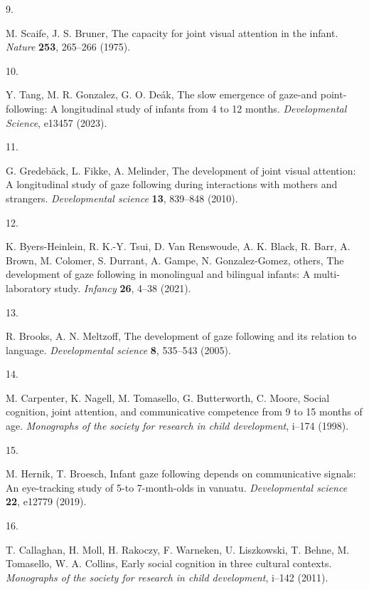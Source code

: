 \documentclass[
  man,floatsintext]{apa6}
\newlength{\cslhangindent}
\newlength{\csllabelwidth}
\newlength{\cslentryspacingunit} %
\newenvironment{CSLReferences}[2] %
 {%
  \setlength{\parindent}{0pt}
  \ifodd #1
  \let\oldpar\par
  \def\par{\hangindent=\cslhangindent\oldpar}
  \fi
  \setlength{\parskip}{#2\cslentryspacingunit}
 }%
 {}
\newcommand{\CSLLeftMargin}[1]{\parbox[t]{\csllabelwidth}{#1}}
\newcommand{\CSLRightInline}[1]{\parbox[t]{\linewidth - \csllabelwidth}{#1}\break}
\begin{document}
\begin{CSLReferences}{0}{0}
\leavevmode{}%
\CSLLeftMargin{9. }%
\CSLRightInline{M. Scaife, J. S. Bruner, The capacity for joint visual attention in the infant. \emph{Nature} \textbf{253}, 265--266 (1975).}

\leavevmode{}%
\CSLLeftMargin{10. }%
\CSLRightInline{Y. Tang, M. R. Gonzalez, G. O. Deák, The slow emergence of gaze-and point-following: A longitudinal study of infants from 4 to 12 months. \emph{Developmental Science}, e13457 (2023).}

\leavevmode{}%
\CSLLeftMargin{11. }%
\CSLRightInline{G. Gredebäck, L. Fikke, A. Melinder, The development of joint visual attention: A longitudinal study of gaze following during interactions with mothers and strangers. \emph{Developmental science} \textbf{13}, 839--848 (2010).}

\leavevmode{}%
\CSLLeftMargin{12. }%
\CSLRightInline{K. Byers-Heinlein, R. K.-Y. Tsui, D. Van Renswoude, A. K. Black, R. Barr, A. Brown, M. Colomer, S. Durrant, A. Gampe, N. Gonzalez-Gomez, others, The development of gaze following in monolingual and bilingual infants: A multi-laboratory study. \emph{Infancy} \textbf{26}, 4--38 (2021).}

\leavevmode{}%
\CSLLeftMargin{13. }%
\CSLRightInline{R. Brooks, A. N. Meltzoff, The development of gaze following and its relation to language. \emph{Developmental science} \textbf{8}, 535--543 (2005).}

\leavevmode{}%
\CSLLeftMargin{14. }%
\CSLRightInline{M. Carpenter, K. Nagell, M. Tomasello, G. Butterworth, C. Moore, Social cognition, joint attention, and communicative competence from 9 to 15 months of age. \emph{Monographs of the society for research in child development}, i--174 (1998).}

\leavevmode{}%
\CSLLeftMargin{15. }%
\CSLRightInline{M. Hernik, T. Broesch, Infant gaze following depends on communicative signals: An eye-tracking study of 5-to 7-month-olds in vanuatu. \emph{Developmental science} \textbf{22}, e12779 (2019).}

\leavevmode{}%
\CSLLeftMargin{16. }%
\CSLRightInline{T. Callaghan, H. Moll, H. Rakoczy, F. Warneken, U. Liszkowski, T. Behne, M. Tomasello, W. A. Collins, Early social cognition in three cultural contexts. \emph{Monographs of the society for research in child development}, i--142 (2011).}


\end{CSLReferences}
\end{document}
